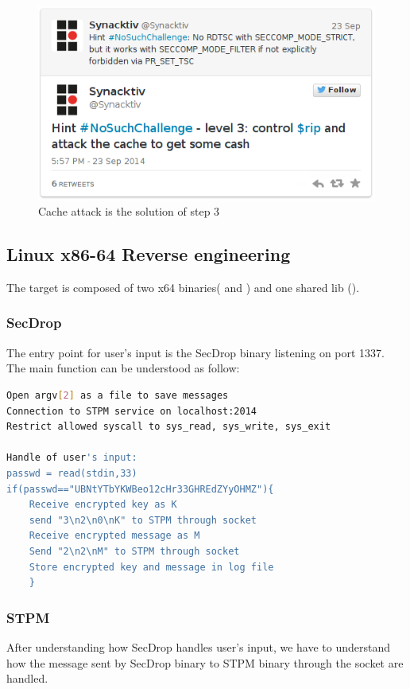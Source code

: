 \documentclass[a4paper]{article}
\begin{document}
\begin{figure}[H]
    \center
    \includegraphics[scale=0.6]{tweet_cache_attack}
    \caption{Cache attack is the solution of step 3}
\end{figure}
\newpage
\subsection{Linux x86-64 Reverse engineering}
The target is composed of two x64 binaries( and ) and one shared lib ().

\subsubsection{SecDrop}
The entry point for user's input is the SecDrop binary listening on port 1337.
The main function can be understood as follow: \newline



\begin{lstlisting}[language=bash,caption={Handling of user's input in SecDrop binary},numbers=none,style=colortilde]
Open argv[2] as a file to save messages
Connection to STPM service on localhost:2014
Restrict allowed syscall to sys_read, sys_write, sys_exit

Handle of user's input: 
passwd = read(stdin,33)
if(passwd=="UBNtYTbYKWBeo12cHr33GHREdZYyOHMZ"){
	Receive encrypted key as K
	send "3\n2\n0\nK" to STPM through socket 
	Receive encrypted message as M
	Send "2\n2\nM" to STPM through socket 
	Store encrypted key and message in log file
	}

\end{lstlisting}


\subsubsection{STPM}
After understanding how SecDrop handles user's input, we have to understand how the message sent by SecDrop binary to STPM binary through the socket are handled. \newline
\end{document}
